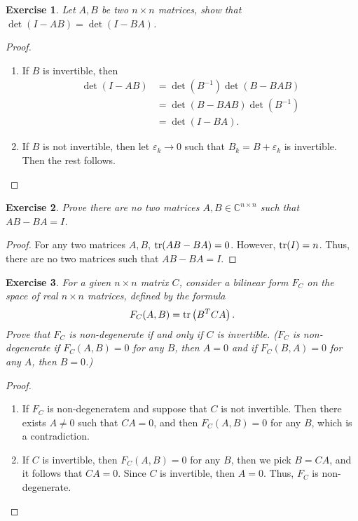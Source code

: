 \documentclass[11pt]{book}
\newtheorem{exercise}{Exercise}[section]
\theoremstyle{definition}
\numberwithin{equation}{subsection}
\begin{document}
\medskip

\begin{exercise}
Let $A, B$ be two $n \times n$ matrices, show that $\det (I - AB) = \det (I - BA)$.
\end{exercise}
\begin{proof}
~\begin{enumerate}[label=(\alph*)]
    \item If $B$ is invertible, then 
    \begin{align*}
        \det (I - AB) & = \det \left(B^{-1}\right) \det (B - BAB) \\
        & = \det (B - BAB) \det \left(B^{-1}\right) \\
        & = \det (I - BA).
    \end{align*}
    
    \item If $B$ is not invertible, then let $\varepsilon_k \to 0$ such that $B_k = B + \varepsilon_k$ is invertible. Then the rest follows.
\end{enumerate}
\end{proof}

\medskip

\begin{exercise}
Prove there are no two matrices $A, B \in \mathbb{C}^{n \times n}$ such that $AB - BA = I$\cite{19}. 
\end{exercise}
\begin{proof}
For any two matrices $A, B$, ${\rm tr}(AB - BA) = 0$\cite{20}. However, ${\rm tr} (I) = n$. Thus, there are no two matrices such that $AB - BA = I$.
\end{proof}

\medskip

\begin{exercise}{\bf *}
For a given $n \times n$ matrix $C$, consider a bilinear form $F_C$ on the space of real $n \times n$ matrices, defined by the formula 
\begin{align*}
    F_C(A, B) = {\rm tr} \left(B^T C A\right).
\end{align*}
Prove that $F_C$ is non-degenerate if and only if $C$ is invertible. ($F_C$ is non-degenerate if $F_C(A,B) = 0$ for any $B$, then $A = 0$ and if $F_C(B,A) = 0$ for any $A$, then $B = 0$.)
\end{exercise}
\begin{proof}
~\begin{enumerate}[label=(\alph*)]
    \item If $F_C$ is non-degeneratem and suppose that $C$ is not invertible. Then there exists $A \neq 0$ such that $CA = 0$, and then $F_C(A,B) = 0$ for any $B$, which is a contradiction.
    
    \item If $C$ is invertible, then $F_C(A, B) = 0$ for any $B$, then we pick $B = CA$, and it follows that $CA = 0$. Since $C$ is invertible, then $A = 0$. Thus, $F_C$ is non-degenerate.
\end{enumerate}
\end{proof}
\end{document}
